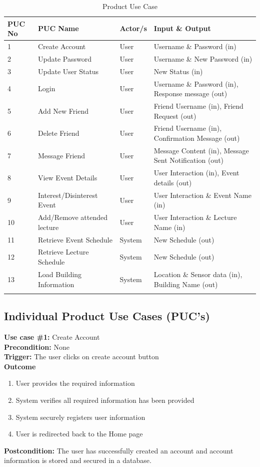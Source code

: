 \documentclass[12pt]{article}
\begin{document}
\begin{longtable}
 {p{} | p{} | p{} | p{}}
  \toprule
  \textbf{PUC No} & \textbf{PUC Name} & \textbf{Actor/s} & \textbf{Input \& Output}\\
  \midrule
  1 & Create Account & User & Username \& Password (in)\\
  \midrule
  2 & Update Password & User & Username \& New Password (in)\\
  \midrule
  3 & Update User Status & User & New Status (in)\\
  \midrule
  4 & Login & User & Username \& Password (in),  Response message (out)\\
   \midrule
  5 & Add New Friend & User & Friend Username (in), Friend Request (out)\\
  \midrule
  6 & Delete Friend & User & Friend Username (in), Confirmation Message (out)\\
  \midrule
  7 & Message Friend & User & Message Content (in), Message Sent Notification (out)\\
  \midrule
  8 & View Event Details & User & User Interaction (in), Event details (out)\\
  \midrule
  9 & Interest/Disinterest Event & User & User Interaction \& Event Name (in)\\
  \midrule
  10 & Add/Remove attended lecture & User & User Interaction \& Lecture Name (in)\\
  \midrule
  11 & Retrieve Event Schedule & System & New Schedule (out)\\
  \midrule
  12 & Retrieve Lecture Schedule & System & New Schedule (out)\\
  \midrule
  13 & Load Building Information & System & Location \& Sensor data (in),  Building Name (out)\\
  \bottomrule
  \caption{Product Use Case} \label{TblPUC}\\
\end{longtable}

\subsection{Individual Product Use Cases (PUC's)}
\textbf{Use case \#1:} Create Account\\
\textbf{Precondition:} None\\
\textbf{Trigger:} The user clicks on create account button\\
\textbf{Outcome}
\begin{enumerate}
    \item User provides the required information
    \item System verifies all required information has been provided
    \item System securely registers user information
    \item User is redirected back to the Home page
\end{enumerate}
\textbf{Postcondition:} The user has successfully created an account and account information is stored and secured in a database.
\end{document}
